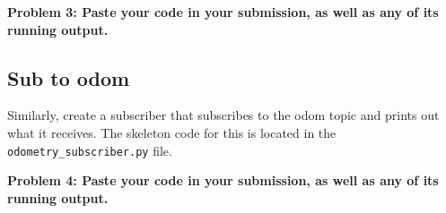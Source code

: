 \documentclass{article}
\begin{document}
{\bf Problem 3: Paste your code in your submission, as well as any of its running output.}

\subsection{Sub to odom}
Similarly, create a subscriber that subscribes to the odom topic and prints out what it receives. The skeleton code for this is located in the \texttt{odometry\_subscriber.py} file.

{\bf Problem 4: Paste your code in your submission, as well as any of its running output.}
\end{document}

